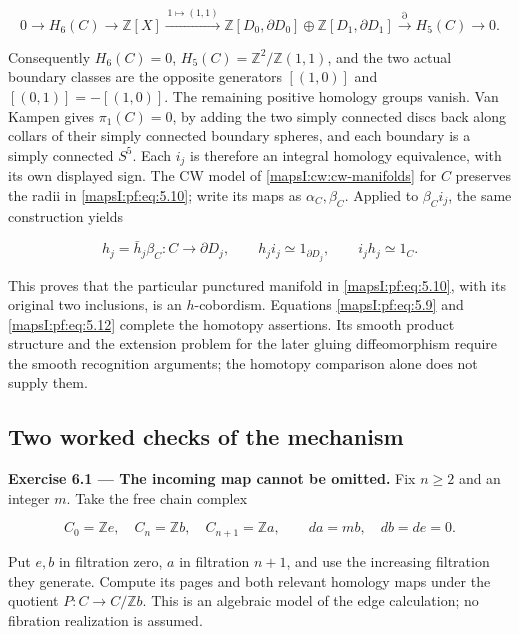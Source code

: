 \documentclass[11pt]{article}
\begin{document}
\begin{equation}
0\longrightarrow H_6(C)\longrightarrow
\mathbb Z[X]\xrightarrow{\,1\mapsto(1,1)\,}
\mathbb Z[D_0,\partial D_0]\oplus\mathbb Z[D_1,\partial D_1]
\xrightarrow{\partial}H_5(C)\longrightarrow0.
\label{mapsI:pf:eq:5.11}
\end{equation}

Consequently \(H_6(C)=0\), \(H_5(C)=\mathbb Z^2/\mathbb Z(1,1)\), and the two actual boundary classes are the opposite generators \([(1,0)]\) and \([(0,1)]=-[(1,0)]\). The remaining positive homology groups vanish. Van Kampen gives \(\pi_1(C)=0\), by adding the two simply connected discs back along collars of their simply connected boundary spheres, and each boundary is a simply connected \(S^5\). Each \(i_j\) is therefore an integral homology equivalence, with its own displayed sign. The CW model of \cref{mapsI:cw:cw-manifolds} for \(C\) preserves the radii in \eqref{mapsI:pf:eq:5.10}; write its maps as \(\alpha_C,\beta_C\). Applied to \(\beta_Ci_j\), the same construction yields

\begin{equation}
h_j=\bar h_j\beta_C:C\to\partial D_j,\qquad
h_ji_j\simeq1_{\partial D_j},\qquad i_jh_j\simeq1_C.
\label{mapsI:pf:eq:5.12}
\end{equation}

This proves that the particular punctured manifold in \eqref{mapsI:pf:eq:5.10}, with its original two inclusions, is an \(h\)-cobordism. Equations \eqref{mapsI:pf:eq:5.9} and \eqref{mapsI:pf:eq:5.12} complete the homotopy assertions. Its smooth product structure and the extension problem for the later gluing diffeomorphism require the smooth recognition arguments; the homotopy comparison alone does not supply them.

\subsection{Two worked checks of the mechanism}
\label{mapsI:pf:path-fibre-exercises}

\textbf{Exercise 6.1 --- The incoming map cannot be omitted.}\label{mapsI:pf:exercise:6.1} Fix \(n\geq2\) and an integer \(m\). Take the free chain complex

\begin{equation}
C_0=\mathbb Ze,\quad C_n=\mathbb Zb,\quad C_{n+1}=\mathbb Za,
\qquad da=mb,\quad db=de=0.
\label{mapsI:pf:eq:6.1}
\end{equation}

Put \(e,b\) in filtration zero, \(a\) in filtration \(n+1\), and use the increasing filtration they generate. Compute its pages and both relevant homology maps under the quotient \(P:C\to C/\mathbb Zb\). This is an algebraic model of the edge calculation; no fibration realization is assumed.
\end{document}
